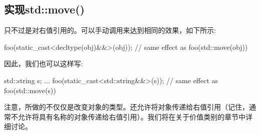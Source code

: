 \subsection{实现std::move()}

只不过是对右值引用的。可以手动调用来达到相同的效果，如下所示:

\begin{cppcode}
foo(static_cast<decltype(obj)&&>(obj)); // same effect as foo(std::move(obj))
\end{cppcode}

因此，我们也可以这样写:

\begin{cppcode}
std::string s;
...
foo(static_cast<std::string&&>(s)); // same effect as foo(std::move(s))
\end{cppcode}

注意，所做的不仅仅是改变对象的类型。还允许将对象传递给右值引用（记住，通常不允许将具有名称的对象传递给右值引用）。我们将在关于价值类别的章节中详细讨论。





























